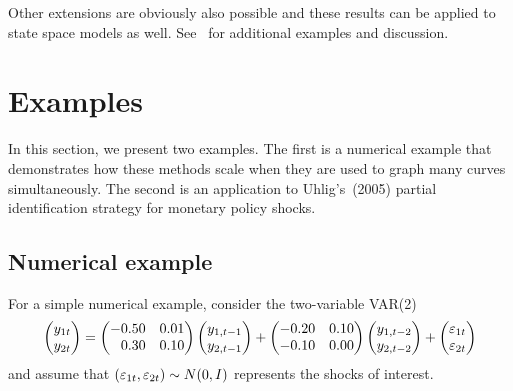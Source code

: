 \documentclass[12pt,fleqn]{article}
\begin{document}
Other extensions are obviously also possible and these results can
be applied to state space models as well. See~\citet{HaS:13} for
additional examples and discussion.

\section{Examples}
\label{S3}
In this section, we present two examples. The first is a numerical
example that demonstrates how these methods scale when they are used
to graph many curves simultaneously. The second is an application to
Uhlig's~(2005) partial identification strategy for monetary policy
shocks.
\nocite{Uhl:05}

\subsection{Numerical example}
\label{S3.1}

For a simple numerical example, consider the two-variable VAR(2)
\begin{equation}
  \label{eq:12}
  \begin{pmatrix*}[l]
    y_{1t} \\ y_{2t}
  \end{pmatrix*}
  =
  \begin{pmatrix*}[r]
    - 0.50 & 0.01 \\ 0.30 & 0.10
  \end{pmatrix*}
  \begin{pmatrix*}[l]
    y_{1,t-1} \\ y_{2,t-1}
  \end{pmatrix*}
  +
  \begin{pmatrix*}[r]
    -0.20 & 0.10 \\ -0.10 & 0.00
  \end{pmatrix*}
  \begin{pmatrix*}[l]
    y_{1,t-2} \\ y_{2,t-2}
  \end{pmatrix*}
  +
  \begin{pmatrix*}[l]
    \vep_{1t} \\ \vep_{2t}
  \end{pmatrix*}
\end{equation}
and assume that $(\varepsilon_{1t},\varepsilon_{2t}) \sim N(0,I)$ represents the
shocks of interest.
\end{document}
